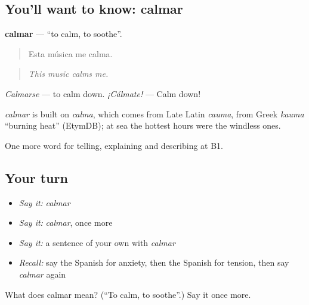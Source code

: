 \subsection*{You'll want to know: calmar}
\textbf{calmar} — \textquotedblleft{}to calm, to soothe\textquotedblright{}.

\begin{quote}
Esta música me calma.
\end{quote}

\begin{quote}
\emph{This music calms me.}
\end{quote}

\emph{Calmarse} — to calm down. \emph{¡Cálmate!} — Calm down!

\begin{cousinweb}
\emph{calmar} is built on \emph{calma}, which comes from Late Latin \emph{cauma}, from Greek \emph{kauma} \textquotedblleft{}burning heat\textquotedblright{} (EtymDB); at sea the hottest hours were the windless ones.
\end{cousinweb}

\begin{grammarlens}[title={What you've built}]
One more word for telling, explaining and describing at B1.
\end{grammarlens}

\subsection*{Your turn}
\begin{itemize}
\raggedright
  \item \emph{Say it:} \emph{calmar}
  \item \emph{Say it:} \emph{calmar}, once more
  \item \emph{Say it:} a sentence of your own with \emph{calmar}
  \item \emph{Recall:} say the Spanish for anxiety, then the Spanish for tension, then say \emph{calmar} again
\end{itemize}

\begin{tcolorbox}[breakable,colback=teal!4,colframe=teal!35!black,title={Before you move on}]
What does calmar mean? (\textquotedblleft{}To calm, to soothe\textquotedblright{}.) Say it once more.
\end{tcolorbox}
